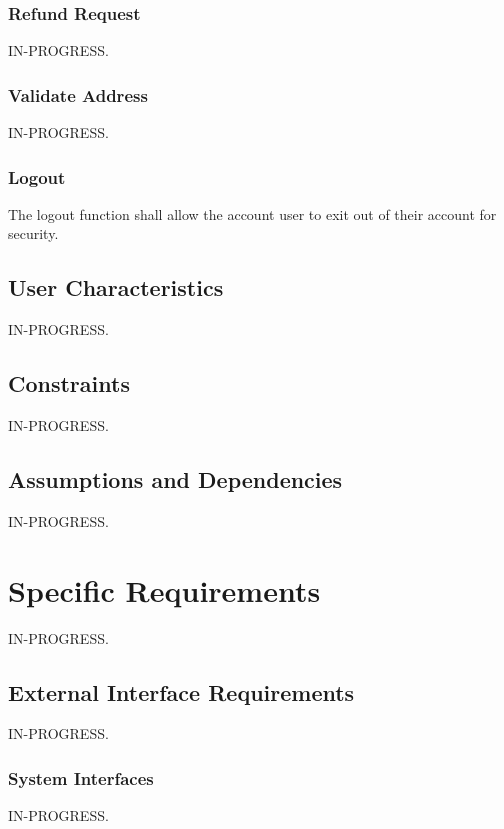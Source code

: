 \documentclass{scrreprt}
\begin{document}
\subsection{Refund Request}

IN-PROGRESS.

\subsection{Validate Address}

IN-PROGRESS.

\subsection{Logout}

The logout function shall allow the account user to exit out of their account
for security.

\section{User Characteristics}

IN-PROGRESS.

\section{Constraints}

IN-PROGRESS.

\section{Assumptions and Dependencies}

IN-PROGRESS.

\chapter{Specific Requirements}

IN-PROGRESS.

\section{External Interface Requirements}

IN-PROGRESS.

\subsection{System Interfaces}

IN-PROGRESS.
\end{document}
